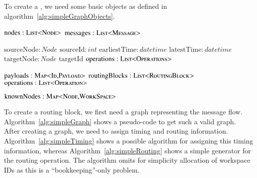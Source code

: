 To create a , we need some basic objects as defined in algorithm~\ref{alg:simpleGraphObjects}.
\begin{breakablealgorithm}
	\label{alg:simpleGraphObjects}
	\begin{algorithmic}[1]
			\State $\text{nodes}:\textsc{List<Node>}$
			\State $\text{messages}:\textsc{List<Message>}$
		\EndObject
		\item[]
			\State $\text{sourceNode}: Node$
			\State $\text{sourceId}: int$
			\State $\text{earliestTime}: datetime$
			\State $\text{latestTime}:datetime$
			\State $\text{targetNode}: Node$
			\State $\text{targetId}$
			\State $\text{operations}: \textsc{List<Operations>}$
		\EndObject
		\item[]
			\State $\text{payloads}:\textsc{Map<Id,Payload>}$
			\State $\text{routingBlocks}:\textsc{List<RoutingBlock>}$
			\State $\text{operations}:\textsc{List<Operation>}$
			\item[]
						
		\EndObject
		\item[]
			\State $\text{knownNodes}:\textsc{Map<Node,WorkSpace>}$
			\item[]
		\EndObject
	\end{algorithmic}
\end{breakablealgorithm}
To create a routing block, we first need a graph representing the message flow. Algorithm~\ref{alg:simpleGraph} shows a pseudo-code to get such a valid graph. After creating a graph, we need to assign timing and routing information. Algorithm~\ref{alg:simpleTiming} shows a possible algorithm for assigning this timing information, whereas Algorithm~\ref{alg:simpleRouting} shows a simple generator for the routing operation. The algorithm omits for simplicity allocation of workspace IDs as this is a ``bookkeeping''-only problem.


